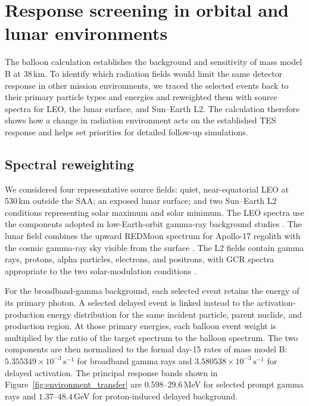 \documentclass[11pt]{article}
\newcommand{\cps}{\ensuremath{\,\mathrm{s^{-1}}}}
\begin{document}
\FloatBarrier

\section{Response screening in orbital and lunar environments}
\label{sec:environment_screening}

The balloon calculation establishes the background and sensitivity of mass
model B at 38\,km. To identify which radiation fields would limit the same
detector response in other mission environments, we traced the selected events
back to their primary particle types and energies and reweighted them with
source spectra for LEO, the lunar surface, and Sun--Earth L2. The calculation
therefore shows how a change in radiation environment acts on the established
TES response and helps set priorities for detailed follow-up simulations.

\subsection{Spectral reweighting}

We considered four representative source fields: quiet, near-equatorial LEO at
530\,km outside the SAA; an exposed lunar surface; and two Sun--Earth L2
conditions representing solar maximum and solar minimum. The LEO spectra use
the components adopted in low-Earth-orbit gamma-ray background studies
\cite{Cumani2019LEO}. The lunar field combines the upward REDMoon spectrum for
Apollo-17 regolith with the cosmic gamma-ray sky visible from the surface
\cite{Dobynde2021REDMoon}. The L2 fields contain gamma rays, protons, alpha
particles, electrons, and positrons, with GCR spectra appropriate to the two
solar-modulation conditions
\cite{Lotti2021Athena,Usoskin2005,Kuznetsov2017}.

For the broadband-gamma background, each selected event retains the energy of
its primary photon. A selected delayed event is linked instead to the
activation-production energy distribution for the same incident particle,
parent nuclide, and production region. At those primary energies, each balloon
event weight is multiplied by the ratio of the target spectrum to the balloon
spectrum. The two components are then normalized to the formal day-15 rates of
mass model B: $5.355349\times10^{-3}\cps$ for broadband gamma rays and
$3.580538\times10^{-3}\cps$ for delayed activation. The principal response
bands shown in Figure~\ref{fig:environment_transfer} are
$0.598$--$29.6$\,MeV for selected prompt gamma rays and
$1.37$--$48.4$\,GeV for proton-induced delayed background.
\end{document}

